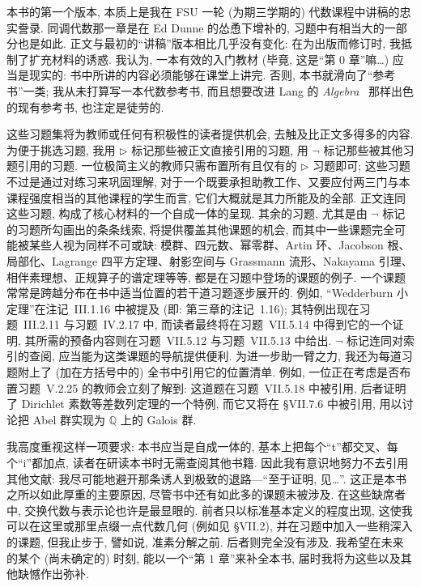本书的第一个版本, 本质上是我在 FSU 一轮 (为期三学期的) 代数课程中讲稿的忠实誊录. 同调代数那一章是在 Ed Dunne 的怂恿下增补的, 习题中有相当大的一部分也是如此. 正文与最初的``讲稿''版本相比几乎没有变化: 在为出版而修订时, 我抵制了扩充材料的诱惑. 我认为, 一本有效的入门教材 (毕竟, 这是``第 $0$ 章''嘛\ldots) 应当是现实的: 书中所讲的内容必须能够在课堂上讲完. 否则, 本书就滑向了``参考书''一类; 我从未打算写一本代数参考书, 而且想要改进 Lang 的 \emph{Algebra}~\cite{lang2002algebra} 那样出色的现有参考书, 也注定是徒劳的.

这些习题集将为教师或任何有积极性的读者提供机会, 去触及比正文多得多的内容. 为便于挑选习题, 我用 $\triangleright$ 标记那些被正文直接引用的习题, 用 $\neg$ 标记那些被其他习题引用的习题. 一位极简主义的教师只需布置所有且仅有的 $\triangleright$ 习题即可; 这些习题不过是通过对练习来巩固理解, 对于一个既要承担助教工作、又要应付两三门与本课程强度相当的其他课程的学生而言, 它们大概就是其力所能及的全部. 正文连同这些习题, 构成了核心材料的一个自成一体的呈现. 其余的习题, 尤其是由 $\neg$ 标记的习题所勾画出的条条线索, 将提供覆盖其他课题的机会, 而其中一些课题完全可能被某些人视为同样不可或缺: 模群、四元数、幂零群、Artin 环、Jacobson 根、局部化、Lagrange 四平方定理、射影空间与 Grassmann 流形、Nakayama 引理、相伴素理想、正规算子的谱定理等等, 都是在习题中登场的课题的例子. 一个课题常常是跨越分布在书中适当位置的若干道习题逐步展开的. 例如, ``Wedderburn 小定理''在注记~III.1.16 中被提及 (即: 第三章的注记~1.16); 其特例出现在习题~III.2.11 与习题~IV.2.17 中, 而读者最终将在习题~VII.5.14 中得到它的一个证明, 其所需的预备内容则在习题~VII.5.12 与习题~VII.5.13 中给出. $\neg$ 标记连同对索引的查阅, 应当能为这类课题的导航提供便利. 为进一步助一臂之力, 我还为每道习题附上了 (加在方括号中的) 全书中引用它的位置清单. 例如, 一位正在考虑是否布置习题~V.2.25 的教师会立刻了解到: 这道题在习题~VII.5.18 中被引用, 后者证明了 Dirichlet 素数等差数列定理的一个特例, 而它又将在 \S VII.7.6 中被引用, 用以讨论把 Abel 群实现为 $\mathbb{Q}$ 上的 Galois 群.

我高度重视这样一项要求: 本书应当是自成一体的, 基本上把每个``t''都交叉、每个``i''都加点, 读者在研读本书时无需查阅其他书籍. 因此我有意识地努力不去引用其他文献: 我尽可能地避开那条诱人到极致的退路---``至于证明, 见\ldots''. 这正是本书之所以如此厚重的主要原因, 尽管书中还有如此多的课题未被涉及. 在这些缺席者中, 交换代数与表示论也许是最显眼的. 前者只以标准基本定义的程度出现, 这使我可以在这里或那里点缀一点代数几何 (例如见 \S VII.2), 并在习题中加入一些稍深入的课题, 但我止步于, 譬如说, 准素分解之前. 后者则完全没有涉及. 我希望在未来的某个 (尚未确定的) 时刻, 能以一个``第 $1$ 章''来补全本书, 届时我将为这些以及其他缺憾作出弥补.

